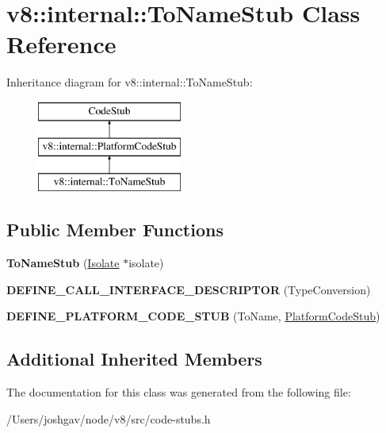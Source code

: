 \hypertarget{classv8_1_1internal_1_1_to_name_stub}{}\section{v8\+:\+:internal\+:\+:To\+Name\+Stub Class Reference}
\label{classv8_1_1internal_1_1_to_name_stub}
Inheritance diagram for v8\+:\+:internal\+:\+:To\+Name\+Stub\+:\begin{figure}[H]
\begin{center}
\leavevmode
\includegraphics[height=3.000000cm]{classv8_1_1internal_1_1_to_name_stub}
\end{center}
\end{figure}
\subsection*{Public Member Functions}
\begin{DoxyCompactItemize}
\item 
{\bfseries To\+Name\+Stub} (\hyperlink{classv8_1_1internal_1_1_isolate}{Isolate} $\ast$isolate)\hypertarget{classv8_1_1internal_1_1_to_name_stub_a87a0cb8b347ae76e43edd5ad4373366c}{}\label{classv8_1_1internal_1_1_to_name_stub_a87a0cb8b347ae76e43edd5ad4373366c}

\item 
{\bfseries D\+E\+F\+I\+N\+E\+\_\+\+C\+A\+L\+L\+\_\+\+I\+N\+T\+E\+R\+F\+A\+C\+E\+\_\+\+D\+E\+S\+C\+R\+I\+P\+T\+OR} (Type\+Conversion)\hypertarget{classv8_1_1internal_1_1_to_name_stub_aa64c7a4a528d3a5b06ce1a5229c58b96}{}\label{classv8_1_1internal_1_1_to_name_stub_aa64c7a4a528d3a5b06ce1a5229c58b96}

\item 
{\bfseries D\+E\+F\+I\+N\+E\+\_\+\+P\+L\+A\+T\+F\+O\+R\+M\+\_\+\+C\+O\+D\+E\+\_\+\+S\+T\+UB} (To\+Name, \hyperlink{classv8_1_1internal_1_1_platform_code_stub}{Platform\+Code\+Stub})\hypertarget{classv8_1_1internal_1_1_to_name_stub_a43e3d50f319f6f62a2ef89ef051e3cd0}{}\label{classv8_1_1internal_1_1_to_name_stub_a43e3d50f319f6f62a2ef89ef051e3cd0}

\end{DoxyCompactItemize}
\subsection*{Additional Inherited Members}


The documentation for this class was generated from the following file\+:\begin{DoxyCompactItemize}
\item 
/\+Users/joshgav/node/v8/src/code-\/stubs.\+h\end{DoxyCompactItemize}
